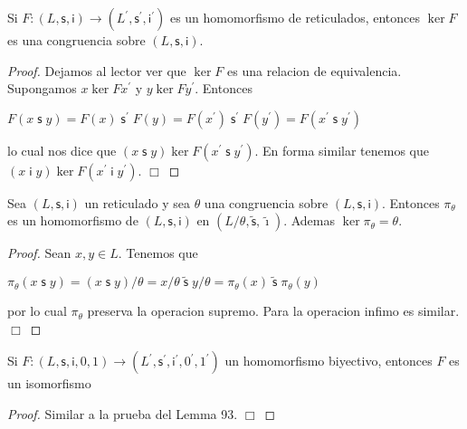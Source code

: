  \begin{lemma}
    Si \(F:(L,\mathsf{s},\mathsf{i})\rightarrow (L^{\prime },\mathsf{s}^{\prime }, \mathsf{i}^{\prime })\) es un homomorfismo de reticulados, entonces \(\ker F\) es una congruencia sobre \((L,\mathsf{s},\mathsf{i})\).
  \end{lemma}
  \begin{proof}
    Dejamos al lector ver que \(\ker F\) es una relacion de equivalencia. Supongamos \(x\ker Fx^{\prime }\) y \(y\ker Fy^{\prime }\). Entonces

    \(\displaystyle F(x\mathsf{\;s\;}y)=F(x)\mathsf{\;s^{\prime }\;}F(y)=F(x^{\prime })\mathsf{ \;s^{\prime }\;}F(y^{\prime })=F(x^{\prime }\mathsf{\;s\;}y^{\prime }) \)

    lo cual nos dice que \((x\mathsf{\;s\;}y)\ker F(x^{\prime }\mathsf{\;s\;} y^{\prime })\). En forma similar tenemos que \((x\mathsf{\;i\;}y)\ker F(x^{\prime }\mathsf{\;i\;}y^{\prime })\). \(\Box\)
  \end{proof}

  \begin{lemma}
    Sea \((L,\mathsf{s},\mathsf{i})\) un reticulado y sea \(\theta \) una congruencia sobre \((L,\mathsf{s},\mathsf{i})\). Entonces \(\pi _{\theta }\) es un homomorfismo de \((L,\mathsf{s},\mathsf{i})\) en \((L/\theta ,\mathsf{\tilde{ s}},\mathsf{\tilde{\imath}})\). Ademas \(\ker \pi _{\theta }=\theta \).
  \end{lemma}
  \begin{proof}
    Sean \(x,y\in L\). Tenemos que

    \(\displaystyle \pi _{\theta }(x\mathsf{\;s\;}y)=(x\mathsf{\;s\;}y)/\theta =x/\theta \mathsf{ \;\tilde{s}\;}y/\theta =\pi _{\theta }(x)\mathsf{\;\tilde{s}\;}\pi _{\theta }(y) \)

    por lo cual \(\pi _{\theta }\) preserva la operacion supremo. Para la operacion infimo es similar. \(\Box\)
  \end{proof}

  \begin{lemma}
    Si \(F:(L,\mathsf{s},\mathsf{i},0,1)\rightarrow (L^{\prime },\mathsf{s} ^{\prime },\mathsf{i}^{\prime },0^{\prime },1^{\prime })\) un homomorfismo biyectivo, entonces \(F\) es un isomorfismo
  \end{lemma}
  \begin{proof}
    Similar a la prueba del Lemma 93. \(\Box\)
  \end{proof}

